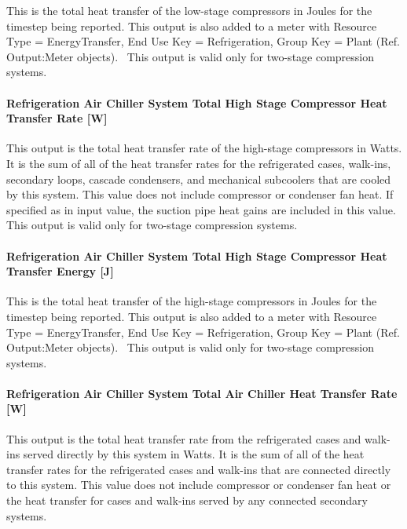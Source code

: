 This is the total heat transfer of the low-stage compressors in Joules for the timestep being reported. This output is also added to a meter with Resource Type = EnergyTransfer, End Use Key = Refrigeration, Group Key = Plant (Ref. Output:Meter objects).~ This output is valid only for two-stage compression systems.

\paragraph{Refrigeration Air Chiller System Total High Stage Compressor Heat Transfer Rate {[}W{]}}\label{refrigeration-air-chiller-system-total-high-stage-compressor-heat-transfer-rate-w}

This output is the total heat transfer rate of the high-stage compressors in Watts. It is the sum of all of the heat transfer rates for the refrigerated cases, walk-ins, secondary loops, cascade condensers, and mechanical subcoolers that are cooled by this system. This value does not include compressor or condenser fan heat. If specified as in input value, the suction pipe heat gains are included in this value.~ This output is valid only for two-stage compression systems.

\paragraph{Refrigeration Air Chiller System Total High Stage Compressor Heat Transfer Energy {[}J{]}}\label{refrigeration-air-chiller-system-total-high-stage-compressor-heat-transfer-energy-j}

This is the total heat transfer of the high-stage compressors in Joules for the timestep being reported. This output is also added to a meter with Resource Type = EnergyTransfer, End Use Key = Refrigeration, Group Key = Plant (Ref. Output:Meter objects).~ This output is valid only for two-stage compression systems.

\paragraph{Refrigeration Air Chiller System Total Air Chiller Heat Transfer Rate {[}W{]}}\label{refrigeration-air-chiller-system-total-air-chiller-heat-transfer-rate-w}

This output is the total heat transfer rate from the refrigerated cases and walk-ins served directly by this system in Watts. It is the sum of all of the heat transfer rates for the refrigerated cases and walk-ins that are connected directly to this system. This value does not include compressor or condenser fan heat or the heat transfer for cases and walk-ins served by any connected secondary systems.

